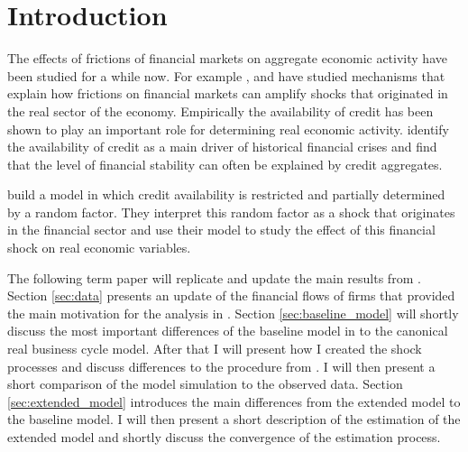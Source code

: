 
\section{Introduction}
\label{sec:introduction}

The effects of frictions of financial markets on aggregate economic activity
have been studied for a while now. For example \textcite{kiyotaki_credit_1997},
\textcite{bernanke_agency_1989} and \textcite{bernanke_financial_1999} have
studied mechanisms that explain how frictions on financial markets can amplify
shocks that originated in the real sector of the economy. Empirically the
availability of credit has been shown to play an important role for determining
real economic activity. \textcite{kindleberger_manias_2011} identify the
availability of credit as a main driver of historical financial crises and
\textcite{schularick_credit_2012} find that the level of financial stability
can often be explained by credit aggregates.

\textcite{jerman_macroeconomic_2012} build a model in which credit availability
is restricted and partially determined by a random factor. They interpret this
random factor as a shock that originates in the financial sector and use their
model to study the effect of this financial shock on real economic variables.

The following term paper will replicate and update the main results from
\textcite{jerman_macroeconomic_2012}. Section \ref{sec:data} presents an update
of the financial flows of firms that provided the main motivation for the
analysis in \textcite{jerman_macroeconomic_2012}. Section
\ref{sec:baseline_model} will shortly discuss the most important differences of
the baseline model in \textcite{jerman_macroeconomic_2012} to the canonical
real business cycle model. After that I will present how I created the shock
processes and discuss differences to the procedure from
\citeauthor{jerman_macroeconomic_2012}. I will then present a short comparison
of the model simulation to the observed data. Section \ref{sec:extended_model}
introduces the main differences from the extended model to the baseline model.
I will then present a short description of the estimation of the extended model
and shortly discuss the convergence of the estimation process.
